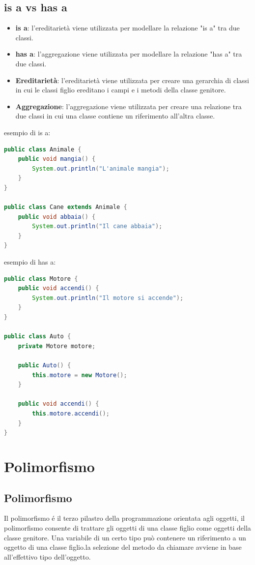 \documentclass[11pt]{article}
\begin{document}
\subsection{is a vs has a}
\begin{itemize}
    \item \textbf{is a}: l'ereditarietà viene utilizzata per modellare la relazione "is a" tra due classi.
    \item \textbf{has a}: l'aggregazione viene utilizzata per modellare la relazione "has a" tra due classi.
    \item \textbf{Ereditarietà}: l'ereditarietà viene utilizzata per creare una gerarchia di classi in cui le classi figlio ereditano i campi e i metodi della classe genitore.
    \item \textbf{Aggregazione}: l'aggregazione viene utilizzata per creare una relazione tra due classi in cui una classe contiene un riferimento all'altra classe.
\end{itemize}
esempio di is a:
\begin{lstlisting}[language=Java]
public class Animale {
    public void mangia() {
        System.out.println("L'animale mangia");
    }
}

public class Cane extends Animale {
    public void abbaia() {
        System.out.println("Il cane abbaia");
    }
}
\end{lstlisting}
esempio di has a:
\begin{lstlisting}[language=Java]
public class Motore {
    public void accendi() {
        System.out.println("Il motore si accende");
    }
}

public class Auto {
    private Motore motore;

    public Auto() {
        this.motore = new Motore();
    }

    public void accendi() {
        this.motore.accendi();
    }
}
\end{lstlisting}
\section{Polimorfismo}
\subsection{Polimorfismo}
Il polimorfismo é il terzo pilastro della programmazione orientata agli oggetti, il polimorfismo consente di trattare gli oggetti di una classe figlio come oggetti della classe genitore.
Una variabile di un certo tipo può contenere un riferimento a un oggetto di una classe figlio.la selezione del metodo da chiamare avviene in base all'effettivo tipo dell'oggetto.
\end{document}
